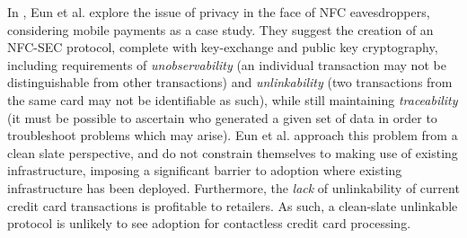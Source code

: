 In \cite{eun2013conditional}, Eun et al. explore the issue of privacy in the face of NFC eavesdroppers, considering mobile payments as a case study.
They suggest the creation of an NFC-SEC protocol, complete with key-exchange and public key cryptography, including requirements of
    \emph{unobservability} (an individual transaction may not be distinguishable from other transactions) and
    \emph{unlinkability} (two transactions from the same card may not be identifiable as such), while still maintaining
    \emph{traceability} (it must be possible to ascertain who generated a given set of data in order to troubleshoot problems which may arise).
Eun et al. approach this problem from a clean slate perspective, and do not constrain themselves to making use of existing infrastructure,
    imposing a significant barrier to adoption where existing infrastructure has been deployed.
Furthermore, the \emph{lack} of unlinkability of current credit card transactions is profitable to retailers.
As such, a clean-slate unlinkable protocol is unlikely to see adoption for contactless credit card processing.

